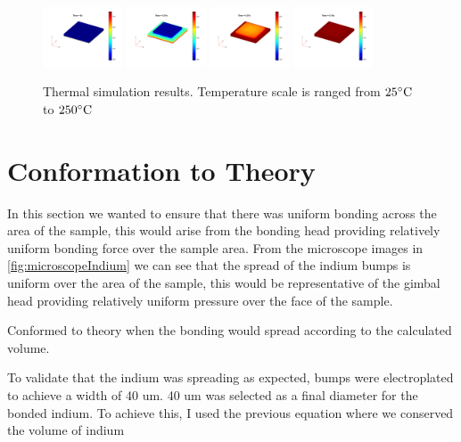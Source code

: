 \begin{figure}
    \centering
    \includegraphics[width=0.21\textwidth]{Main/Ch2/heat/001.png}
    \includegraphics[width=0.21\textwidth]{Main/Ch2/heat/002.png}
    \includegraphics[width=0.21\textwidth]{Main/Ch2/heat/008.png}
    \includegraphics[width=0.21\textwidth]{Main/Ch2/heat/020.png}
    \caption{Thermal simulation results. Temperature scale is ranged from $25 \dC$ to $250 \dC$}
    \label{fig:thermal_simulations}
\end{figure}


\section{Conformation to Theory}
In this section we wanted to ensure that there was uniform bonding across the area of the sample, this would arise from the bonding head providing relatively uniform bonding force over the sample area. From the microscope images in \ref{fig:microscopeIndium} we can see that the spread of the indium bumps is uniform over the area of the sample, this would be representative of the gimbal head providing relatively uniform pressure over the face of the sample.

Conformed to theory when the bonding would spread according to the calculated volume.

To validate that the indium was spreading as expected, bumps were electroplated to achieve a width of 40 um. 40 um was selected as a final diameter for the bonded indium. To achieve this, I used the previous equation where we conserved the volume of indium %

